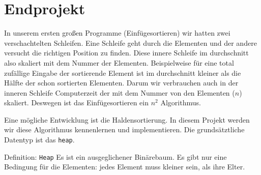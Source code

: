 \section{Endprojekt}


In unserem ersten großen Programme (Einfügesortieren) wir hatten
zwei verschachtelten Schleifen. Eine Schleife geht durch die Elementen
und der andere versucht die richtigen Position zu finden. Diese
innere Schleife im durchschnitt also skaliert mit dem Nummer der Elementen.
Beispielweise für eine total zufällige Eingabe der sortierende Element ist im 
durchschnitt kleiner als die Hälfte der schon sortierten Elementen. Darum 
wir verbrauchen  auch in der inneren Schleife Computerzeit der mit 
dem Nummer von den Elementen ($n$) skaliert. Deswegen ist das Einfügesortieren
ein $n^2$ Algorithmus.

Eine mögliche Entwicklung ist die Haldensortierung. In diesem Projekt werden wir 
diese Algorithmus kennenlernen und implementieren. Die grundsätztliche Datentyp ist 
das \texttt{heap}.

\begin{myexampleblock}{Definition: \texttt{Heap}}
Es ist ein ausgeglichener Binärebaum. Es gibt nur eine Bedingung für die Elementen:
jedes Element muss kleiner sein, als ihre Elter.
\end{myexampleblock} 


